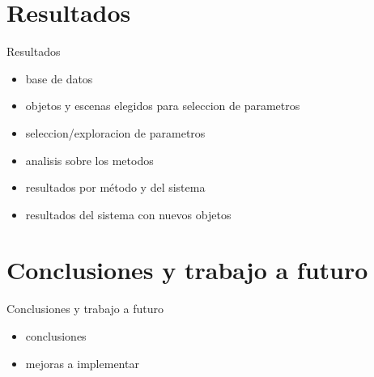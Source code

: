 \documentclass[]{beamer}
\begin{document}


\section{Resultados}
\begin{frame}{Resultados}
    \begin{itemize}
        \item base de datos
        \item objetos y escenas elegidos para seleccion de parametros
        \item seleccion/exploracion de parametros
        \item analisis sobre los metodos
        \item resultados por método y del sistema
        \item resultados del sistema con nuevos objetos
    \end{itemize}
\end{frame}


\section{Conclusiones y trabajo a futuro}
\begin{frame}{Conclusiones y trabajo a futuro}
    \begin{itemize}
        \item conclusiones
        \item mejoras a implementar
    \end{itemize}
\end{frame}
\end{document}
